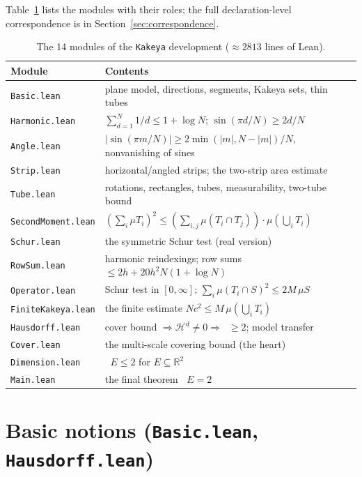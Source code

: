 \documentclass[11pt,a4paper]{article}
\newcommand{\ennr}{\ensuremath{[0,\infty]}}          %
\DeclareMathOperator{\Hdim}{dim_H}
\newcommand{\HM}[1]{\mathcal{H}^{#1}}                %
\newcommand{\Plane}{\ensuremath{\mathbb{R}^{2}}}     %
\newcommand{\lname}[1]{\texttt{#1}}                  %
\theoremstyle{definition}
\theoremstyle{remark}
\begin{document}
Table~\ref{tab:modules} lists the modules with their roles; the full declaration-level
correspondence is in Section~\ref{sec:correspondence}.

\begin{table}[ht]
\centering\small
\begin{tabular}{@{}ll@{}}
\toprule
Module & Contents \\
\midrule
\lname{Basic.lean}        & plane model, directions, segments, Kakeya sets, thin tubes \\
\lname{Harmonic.lean}     & $\sum_{d=1}^{N}1/d\le 1+\log N$; $\sin(\pi d/N)\ge 2d/N$ \\
\lname{Angle.lean}        & $|\sin(\pi m/N)|\ge 2\min(|m|,N-|m|)/N$, nonvanishing of sines \\
\lname{Strip.lean}        & horizontal/angled strips; the two-strip area estimate \\
\lname{Tube.lean}         & rotations, rectangles, tubes, measurability, two-tube bound \\
\lname{SecondMoment.lean} & $(\sum_i\mu T_i)^2\le(\sum_{i,j}\mu(T_i\cap T_j))\cdot\mu(\bigcup_i T_i)$ \\
\lname{Schur.lean}        & the symmetric Schur test (real version) \\
\lname{RowSum.lean}       & harmonic reindexings; row sums $\le 2h+20h^2N(1+\log N)$ \\
\lname{Operator.lean}     & Schur test in $\ennr$; $\sum_i\mu(T_i\cap S)^2\le 2M\,\mu S$ \\
\lname{FiniteKakeya.lean} & the finite estimate $Nc^2\le M\,\mu(\bigcup_i T_i)$ \\
\lname{Hausdorff.lean}    & cover bound $\Rightarrow \HM{d}\ne 0 \Rightarrow \Hdim\ge 2$; model transfer \\
\lname{Cover.lean}        & the multi-scale covering bound (the heart) \\
\lname{Dimension.lean}    & $\Hdim E\le 2$ for $E\subseteq\Plane$ \\
\lname{Main.lean}         & the final theorem $\Hdim E = 2$ \\
\bottomrule
\end{tabular}
\caption{The 14 modules of the \lname{Kakeya} development ($\approx 2813$ lines of Lean).}
\label{tab:modules}
\end{table}

\section{Basic notions (\lname{Basic.lean}, \lname{Hausdorff.lean})}
\end{document}

